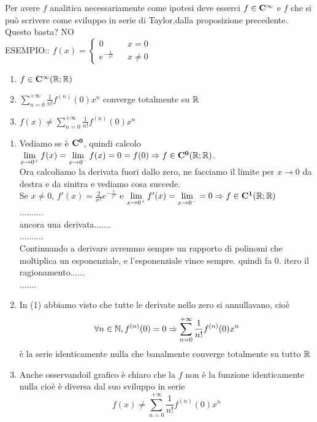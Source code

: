 Per avere $f$ analitica  necessariamente come ipotesi deve esserci $f\in \cntclass{\infty}$ e $f$ che si può scrivere come sviluppo in serie di Taylor,dalla proposizione precedente. Questo basta? NO\\
ESEMPIO:: $f(x)=\left\{\begin{matrix}0&& x=0\\e^{-\frac{1}{x^2}}&&x\ne 0\end{matrix}\right.$\\
\begin{center}
	\begin{tikzpicture}[scale=1]
	\end{tikzpicture}
\end{center}
\begin{enumerate}
	\item $f\in \cntclass{\infty}( \R; \R)$
	\item $\sum\limits_{n=0}^{+\infty}\frac{1}{n!}f^{(n)}(0)x^n$ converge totalmente su $ \R$
	\item $f(x)\ne\sum\limits_{n=0}^{+\infty}\frac{1}{n!}f^{(n)}(0)x^n$
\end{enumerate}
\begin{enumerate}
	\item Vediamo se è $\cntclass{0}$, quindi calcolo $\lim\limits_{x\to 0^{+}}f(x)=\lim\limits_{x\to 0^{-}}f(x)=0=f(0)\Rightarrow f\in \cntclass{0}( \R; \R)$.\\
	Ora calcoliamo la derivata fuori dallo zero, ne facciamo il limite per $x\to 0$ da destra e da sinitra e vediamo cosa succede.\\
	Se $x\ne 0$, $f'(x)=\frac{2}{x^3}e^{-\frac{1}{x^3}}$ e $\lim\limits_{x\to 0^{+}}f'(x)=\lim\limits_{x\to 0^{-}} = 0\Rightarrow f\in \cntclass{1}( \R; \R)$\\
	..........\\
	ancora una derivata.......\\
	..........\\
	Continuando a derivare  avremmo sempre un rapporto di polinomi che moltiplica un esponenziale, e l'esponenziale vince sempre. quindi fa $0$.
	itero il ragionamento......\\
	.......\\
	\item In (1) abbiamo visto  che tutte le derivate nello zero si annullavano, cioè
	$$\forall n\in\N, f^{(n)}(0)=0\Rightarrow \sum\limits_{n=0}^{+\infty}\frac{1}{n!}f^{(n)}(0)x^n$$
	è la serie identicamente nulla  che banalmente converge totalmente su tutto $ \R$
	\item Anche osservandoil grafico è chiaro che la $f$ non è la funzione identicamente nulla cioè è diversa dal suo sviluppo in serie
	$$f(x)\ne\sum\limits_{n=0}^{+\infty}\frac{1}{n!}f^{(n)}(0)x^n$$
\end{enumerate}
